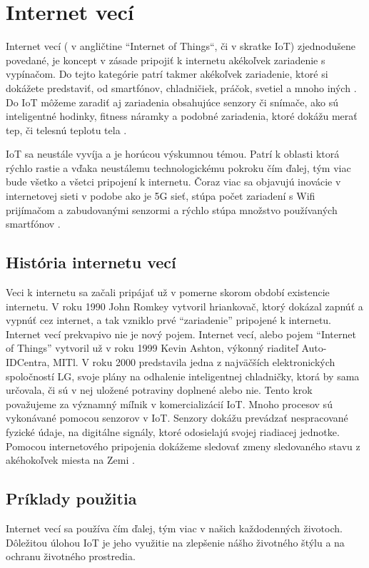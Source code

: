 \documentclass[twoside]{ctuthesis}
\theoremstyle{plain}
\theoremstyle{definition}
\theoremstyle{note}
\begin{document}
\chapter{Internet vecí}

Internet vecí ( v angličtine “Internet of Things“, či v skratke IoT) zjednodušene povedané, je koncept v zásade pripojiť k internetu akékoľvek zariadenie s vypínačom. Do tejto kategórie patrí takmer akékoľvek zariadenie, ktoré si dokážete predstaviť, od smartfónov, chladničiek, práčok, svetiel a mnoho iných \cite{morgan}. 
Do IoT môžeme zaradiť aj zariadenia obsahujúce senzory či snímače, ako sú inteligentné hodinky, fitness náramky a podobné zariadenia, ktoré dokážu merať tep, či telesnú teplotu tela \cite{economy}. 

 IoT sa neustále vyvíja a je horúcou výskumnou témou. Patrí k oblasti ktorá rýchlo rastie a vďaka neustálemu technologickému pokroku čím ďalej, tým viac bude všetko a všetci pripojení k internetu.
 Čoraz viac sa objavujú inovácie v internetovej sieti v podobe ako je 5G sieť, stúpa počet zariadení s Wifi prijímačom a zabudovanými senzormi a rýchlo stúpa množstvo používaných smartfónov \cite{iot}.  
 
 
 \section{História internetu vecí}

Veci k internetu sa začali pripájať už v pomerne skorom období existencie internetu. V roku 1990 John Romkey vytvoril hriankovač, ktorý dokázal zapnúť a vypnúť cez internet, a tak vzniklo prvé “zariadenie” pripojené k internetu. Internet vecí prekvapivo nie je nový pojem. Internet vecí, alebo pojem “Internet of Things” vytvoril už v roku 1999 Kevin Ashton, výkonný riaditeľ Auto-IDCentra, MITl. 
V roku 2000 predstavila jedna z najväčších elektronických spoločností LG, svoje plány na odhalenie inteligentnej chladničky, ktorá by sama určovala, či sú v nej uložené potraviny doplnené alebo nie. Tento krok považujeme za významný míľnik v komercializácií IoT.
Mnoho procesov sú vykonávané pomocou senzorov v IoT. Senzory dokážu prevádzať nespracované fyzické údaje, na digitálne signály, ktoré odosielajú svojej riadiacej jednotke. Pomocou internetového pripojenia dokážeme sledovať zmeny sledovaného stavu z akéhokoľvek miesta na Zemi \cite{suresh}.  
 
 \section{Príklady použitia}
 Internet vecí sa používa čím ďalej, tým viac v našich každodenných životoch. Dôležitou úlohou IoT je jeho využitie na zlepšenie nášho životného štýlu a na ochranu životného prostredia. 
 
\end{document}
